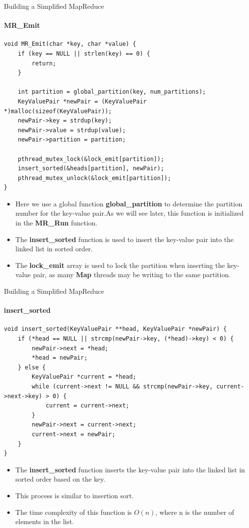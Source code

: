 \documentclass[10pt]{beamer}
\begin{document}
\begin{frame}[fragile]{Building a Simplified MapReduce}
    \framesubtitle{MR\_Emit}
    \begin{lstlisting}
void MR_Emit(char *key, char *value) {
    if (key == NULL || strlen(key) == 0) {
        return;
    }

    int partition = global_partition(key, num_partitions);
    KeyValuePair *newPair = (KeyValuePair *)malloc(sizeof(KeyValuePair));
    newPair->key = strdup(key);
    newPair->value = strdup(value);
    newPair->partition = partition;

    pthread_mutex_lock(&lock_emit[partition]);
    insert_sorted(&heads[partition], newPair);
    pthread_mutex_unlock(&lock_emit[partition]);
}
              \end{lstlisting}
    \begin{itemize}
        \item Here we use a global function \textbf{global\_partition} to determine the partition number for the key-value pair.As we will see later, this function is initialized in the \textbf{MR\_Run} function.
        \item The \textbf{insert\_sorted} function is used to insert the key-value pair into the linked list in sorted order.
        \item The \textbf{lock\_emit} array is used to lock the partition when inserting the key-value pair, as many \textbf{Map} threads may be writing to the same partition.
    \end{itemize}
\end{frame}

\begin{frame}[fragile]{Building a Simplified MapReduce}
    \framesubtitle{insert\_sorted}
    \begin{lstlisting}
void insert_sorted(KeyValuePair **head, KeyValuePair *newPair) {
    if (*head == NULL || strcmp(newPair->key, (*head)->key) < 0) {
        newPair->next = *head;
        *head = newPair;
    } else {
        KeyValuePair *current = *head;
        while (current->next != NULL && strcmp(newPair->key, current->next->key) > 0) {
            current = current->next;
        }
        newPair->next = current->next;
        current->next = newPair;
    }
}
              \end{lstlisting}
    \begin{itemize}
        \item The \textbf{insert\_sorted} function inserts the key-value pair into the linked list in sorted order based on the key.
        \item This process is similar to insertion sort.
        \item The time complexity of this function is $O(n)$, where n is the number of elements in the list.
    \end{itemize}
\end{frame}
\end{document}
